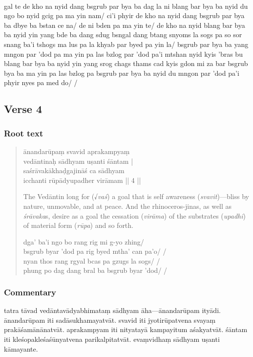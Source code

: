 \documentclass[12pt]{article}
\newcommand{\emdash} {\hspace{0em}—\hspace{0em}}
\begin{document}
\textbf{\TVB}\\
gal te de kho na nyid dang bsgrub par bya ba dag la ni blang bar bya ba nyid du ngo bo nyid gcig pa ma yin nam/ ci'i phyir de kho na nyid dang bsgrub par bya ba dbye ba bstan ce na/ de ni bden pa ma yin te/ de kho na nyid blang bar bya ba nyid yin yang bde ba dang sdug bsngal dang btang snyoms la sogs pa so sor snang ba'i tshogs ma lus pa la khyab par byed pa yin la/ bsgrub par bya ba yang mngon par 'dod pa ma yin pa las bzlog par 'dod pa'i mtshan nyid kyis 'bras bu blang bar bya ba nyid yin yang srog chags thams cad kyis gdon mi za bar bsgrub bya ba ma yin pa las bzlog pa bsgrub par bya ba nyid du mngon par 'dod pa'i phyir nyes pa med do/ /

\subsection{Verse 4}
\subsubsection{Root text}
\begin{quote}
	ānandarūpaṃ svavid aprakampyaṃ \\
	vedāntinaḥ sādhyam uṣanti śāntam\footnoteB{
		śāntam] \corr ; sāntam \MS\ \EDD
	} |\\
	saśrāvakākhaḍgajināś ca sādhyam\\
	icchanti rūpādyupadher virāmam || 4 ||

	The Vedāntin long for (√\emph{vaś}) a goal that is self awareness (\emph{svavit})\emdash bliss by nature, unmovable, and at peace. And the rhinoceros-jinas, as well as \emph{śrāvaka}s, desire as a goal the cessation (\emph{virāma}) of the substrates (\emph{upadhi}) of material form (\emph{rūpa}) and so forth.

	dga' ba'i ngo bo rang rig mi g-yo zhing/ \\
	bsgrub byar 'dod pa rig byed mtha' can pa'o/ /\\
	nyan thos rang rgyal bcas pa gzugs la sogs/ /\\
	phung po dag dang bral ba bsgrub byar 'dod/ /
\end{quote}

\subsubsection{Commentary}
tatra tāvad vedāntavādyabhimataṃ sādhyam āha\emdash ānandarūpam ityādi.
ānandarūpam iti sadāsukhamayatvāt.
svavid iti jyotirūpatvena\footnoteB{
	jyotīrūpatvena] \MS ; jyotirūpatvena \EDD
} svayaṃ prakāśamānānatvāt.\footnoteB{
	prakāśamānānatvāt] \EDD\ (\emd); prakāśamānāt \MS
}
aprakampyam iti nityatayā\footnoteB{
	nityatayā] \EDD ; anityatayā \MS
} kampayitum aśakyatvāt.
śāntam\footnoteB{
	śāntam] \corr ; sāntam \MS\ \EDD
} iti kleśopakleśaśūnyatvena parikalpitatvāt.
evaṃvidhaṃ sādhyam uṣanti kāmayante.\\
\end{document}
